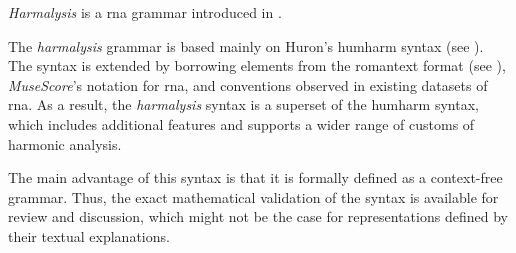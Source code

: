 

\emph{Harmalysis} is a \gls{rna} grammar introduced in
\textcite{napoleslopez2020harmalysis}.

The \emph{harmalysis} grammar is based mainly on Huron's
\gls{humharm} syntax (see ).
The syntax is extended by borrowing elements from the
\gls{romantext} format (see ),
\emph{MuseScore}'s notation for
\gls{rna},
and conventions observed in existing datasets of \gls{rna}.
As  a result,  the \emph{harmalysis} syntax is a superset of
the \gls{humharm} syntax,  which includes additional
features and supports a wider range of customs of harmonic
analysis.

The main advantage of this syntax is that it is formally
defined as a context-free grammar. Thus, the exact
mathematical validation of the syntax is available for
review and discussion, which might not be the case for
representations defined by their textual explanations.
